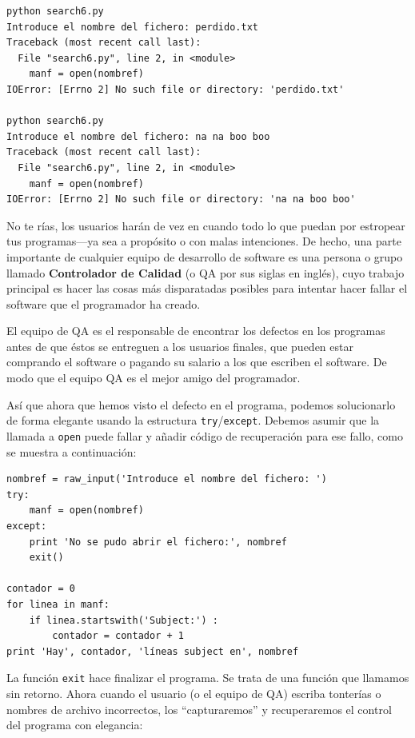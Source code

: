 \beforeverb
\begin{verbatim}
python search6.py 
Introduce el nombre del fichero: perdido.txt
Traceback (most recent call last):
  File "search6.py", line 2, in <module>
    manf = open(nombref)
IOError: [Errno 2] No such file or directory: 'perdido.txt'

python search6.py 
Introduce el nombre del fichero: na na boo boo
Traceback (most recent call last):
  File "search6.py", line 2, in <module>
    manf = open(nombref)
IOError: [Errno 2] No such file or directory: 'na na boo boo'
\end{verbatim}
\afterverb
%
No te rías, los usuarios harán de vez en cuando todo lo que puedan por estropear
tus programas---ya sea a propósito o con malas intenciones.
De hecho, una parte importante de cualquier equipo de desarrollo de software
es una persona o grupo llamado {\bf Controlador de Calidad}
(o QA por sus siglas en inglés), cuyo trabajo principal es hacer las cosas más disparatadas
posibles para intentar hacer fallar el software que el programador ha creado.

El equipo de QA es el responsable de encontrar los defectos en los programas antes
de que éstos se entreguen a los usuarios finales, que pueden estar comprando el
software o pagando su salario a los que escriben el software. De modo que el equipo QA
es el mejor amigo del programador.

Así que ahora que hemos visto el defecto en el programa, podemos solucionarlo
de forma elegante usando la estructura {\tt try}/{\tt except}. Debemos asumir que la llamada
a {\tt open} puede fallar y añadir código de recuperación para ese fallo,
como se muestra a continuación:

\beforeverb
\begin{verbatim}
nombref = raw_input('Introduce el nombre del fichero: ')
try:
    manf = open(nombref)
except:
    print 'No se pudo abrir el fichero:', nombref
    exit()

contador = 0
for linea in manf:
    if linea.startswith('Subject:') : 
        contador = contador + 1
print 'Hay', contador, 'líneas subject en', nombref
\end{verbatim}
\afterverb
%
La función {\tt exit} hace finalizar el programa. Se trata de una función
que llamamos sin retorno. Ahora cuando el usuario (o
el equipo de QA) escriba tonterías o nombres de archivo incorrectos,
los ``capturaremos'' y recuperaremos el control del programa con elegancia:

